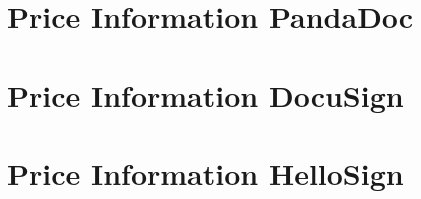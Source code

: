 \section{Price Information PandaDoc} \label{sec:pandaPrice}


\section{Price Information DocuSign} \label{sec:docusignPrice}


\section{Price Information HelloSign} \label{sec:hellosignPrice}
